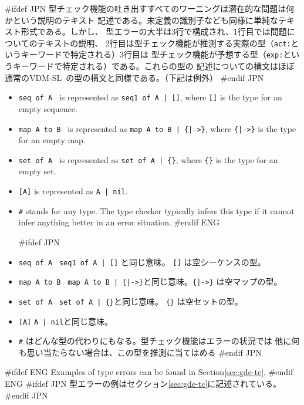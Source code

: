 \documentclass[\pformat,12pt]{article}
\newcommand{\vdmslpp}{VDM-SL}
\newcommand{\vdmslpp}{VDM++}
\begin{document}
#ifdef JPN
型チェック機能の吐き出すすべてのワーニングは潜在的な問題は何かという説明のテキスト
記述である。未定義の識別子なども同様に単純なテキスト形式である。しかし、
型エラーの大半は3行で構成され、1行目では問題についてのテキストの説明、
2行目は型チェック機能が推測する実際の型（\texttt{act:}というキーワードで特定される）3行目は
型チェック機能が予想する型（\texttt{exp:}というキーワードで特定される）である。これらの型の
記述についての構文はほぼ通常の\vdmslpp\ の型の構文と同様である。（下記は例外）
#endif JPN

\begin{itemize}
#ifdef ENG
\item {\tt seq of A } is represented as {\tt seq1 of A | []}, where
  {\tt []} is the type for an empty sequence.
  
\item {\tt map A to B } is represented as {\tt map A to B | \{|->\}},
  where {\tt \{|->\}} is the type for an empty map.
  
\item {\tt set of A } is represented as {\tt set of A | \{\}}, where
  {\tt \{\}} is the type for an empty set.
  
\item {\tt [A]} is represented as {\tt A | nil}.
  
\item {\tt \#} stands for any type. The type checker typically infers
  this type if it cannot infer anything better in an error situation.
#endif ENG

#ifdef JPN
\item {\tt seq of A }  {\tt seq1 of A | []} と同じ意味。 {\tt []} は空シーケンスの型。
  
\item {\tt map A to B } {\tt map A to B | \{|->\}}と同じ意味。{\tt \{|->\}} は空マップの型。 
  
\item {\tt set of A } {\tt set of A | \{\}}と同じ意味。 {\tt \{\}} は空セットの型。
  
\item {\tt [A]}  {\tt A | nil}と同じ意味。
  
\item {\tt \#} はどんな型の代わりにもなる。型チェック機能はエラーの状況では
  他に何も思い当たらない場合は、この型を推測に当てはめる
#endif JPN
\end{itemize}

#ifdef ENG
Examples of type errors can be found in Section\ref{sec:gde-tc}.
#endif ENG
#ifdef JPN
型エラーの例はセクション\ref{sec:gde-tc}に記述されている。
#endif JPN
\end{document}
